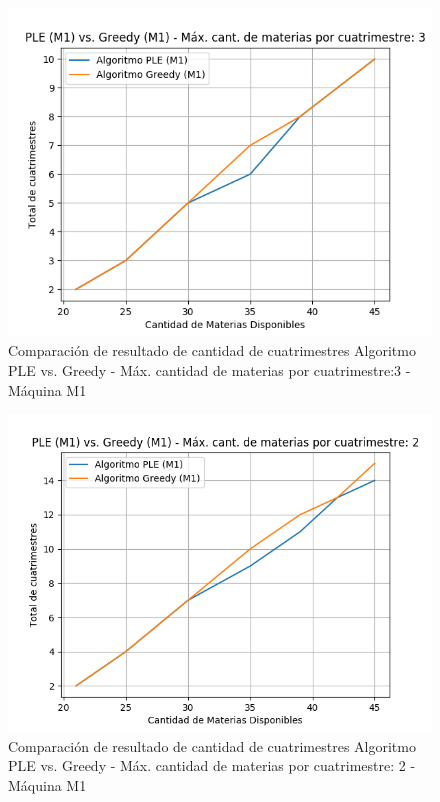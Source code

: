 \documentclass[a4paper]{article}
\begin{document}
\begin{figure}[H]
\centering
\includegraphics[scale=0.65]{Imagenes/m1_PLE_vs_GREEDY_total_cuatrimestres_max_mat_3.png}\par
\caption{Comparación de resultado de cantidad de cuatrimestres Algoritmo PLE vs. Greedy - Máx. cantidad de materias por cuatrimestre:3 - Máquina M1}
\end{figure}

\begin{figure}[H]
\centering
\includegraphics[scale=0.65]{Imagenes/m1_PLE_vs_GREEDY_total_cuatrimestres_max_mat_2.png}\par
\caption{Comparación de resultado de cantidad de cuatrimestres Algoritmo PLE vs. Greedy - Máx. cantidad de materias por cuatrimestre: 2 - Máquina M1}
\end{figure}
\end{document}
